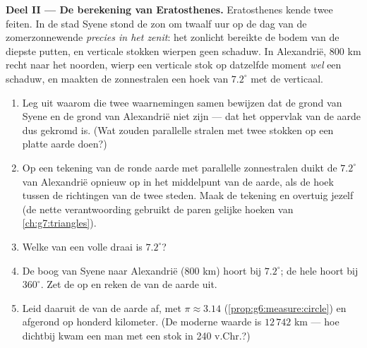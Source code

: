 \begin{problem}
\medskip
\noindent\textbf{Deel II --- De berekening van Eratosthenes.}
Eratosthenes kende twee feiten. In de stad Syene stond de zon om twaalf uur op de
dag van de zomerzonnewende \emph{precies in het zenit}: het zonlicht bereikte de
bodem van de diepste putten, en verticale stokken wierpen geen schaduw. In
Alexandrië, $800$ km recht naar het noorden, wierp een verticale stok op datzelfde
moment \emph{wel} een schaduw, en maakten de zonnestralen een hoek van $7.2^\circ$
met de verticaal.
\begin{enumerate}[resume]
  \item Leg uit waarom die twee waarnemingen samen bewijzen dat de grond van Syene
        en de grond van Alexandrië niet  zijn --- dat het oppervlak van de
        aarde dus gekromd is. (Wat zouden parallelle stralen met twee stokken op een
        platte aarde doen?)
  \item Op een tekening van de ronde aarde met parallelle zonnestralen duikt de
        $7.2^\circ$ van Alexandrië opnieuw op in het middelpunt van de aarde, als
        de hoek tussen de richtingen van de twee steden. Maak de tekening en
        overtuig jezelf (de nette verantwoording gebruikt de paren gelijke hoeken
        van \cref{ch:g7:triangles}).
  \item Welke  van een volle draai is $7.2^\circ$?
  \item De boog van Syene naar Alexandrië ($800$ km) hoort bij $7.2^\circ$; de hele
         hoort bij $360^\circ$. Zet de  op en reken de  van
        de aarde uit.
  \item Leid daaruit de  van de aarde af, met $\pi \approx 3.14$
        (\cref{prop:g6:measure:circle}) en afgerond op honderd kilometer. (De
        moderne waarde is $12\,742$ km --- hoe dichtbij kwam een man met een stok in
        240 v.Chr.?)
\end{enumerate}


\end{problem}

